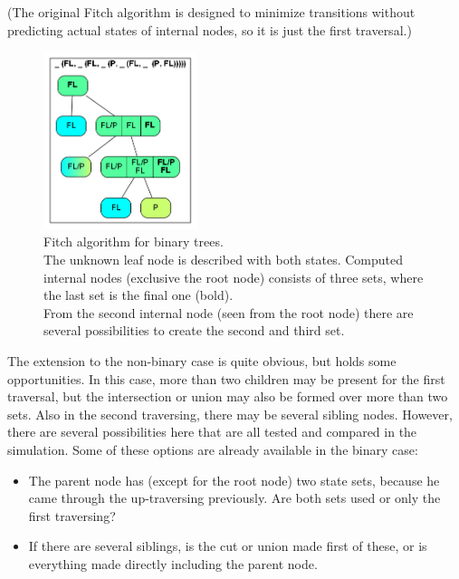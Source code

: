       (The original Fitch algorithm is designed to minimize transitions without predicting actual states 
        of internal nodes, so it is just the first traversal.) \\
        \begin{figure}
          \centering
          \includegraphics[width=0.4\textwidth]{Figures/Fitch1.png}
          \caption{Fitch algorithm for binary trees. \\
            The unknown leaf node is described with both states. Computed internal nodes (exclusive the 
            root node) consists of three sets, where the last set is the final one (bold). \\
            From the second internal node (seen from the root node) there are several possibilities to 
            create the second and third set.}
          \label{fig: binary Fitch}
        \end{figure}
      The extension to the non-binary case is quite obvious, but holds some opportunities. In this case, 
        more than two children may be present for the first traversal, but the intersection or union may 
        also be formed over more than two sets. Also in the second traversing, there may be several 
        sibling nodes. However, there are several possibilities here that are all tested and compared 
        in the simulation. Some of these options are already available in the binary case:
      \begin{itemize}
        \item The parent node has (except for the root node) two state sets, because he came through 
          the up-traversing previously. Are both sets used or only the first traversing?
        \item If there are several siblings, is the cut or union made first of these, or is everything 
          made directly including the parent node.
      \end{itemize}
